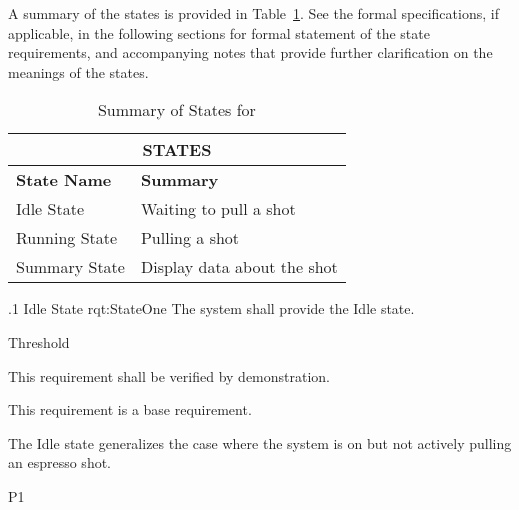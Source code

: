 A summary of the states is provided in Table~\ref{tab:States}.
See the formal specifications, if applicable, in the following sections for formal statement of the state requirements, and accompanying notes that provide further clarification on the meanings of the states.

\begin{table}[h]
	\begin{center}
		\begin{tabular}{|p{1.0in}|p{5.0in}|}
			\hline
			\hline
			\multicolumn{2}{|c|}{{\bf STATES}} \\
			\hline
				{\bf State Name} & {\bf Summary} \\
			\hline
			\hline
Idle State & Waiting to pull a shot \\ \hline
Running State & Pulling a shot \\ \hline
Summary State & Display data about the shot \\ 
			\hline
			\hline
		\end{tabular}
		\caption{Summary of States for \ThisSystem}
		\label{tab:States}
	\end{center}
\end{table}


\ONERQMTV
{\RqtNumberBase.1}
{Idle State}
{rqt:StateOne}
{The system shall provide the Idle state.}
{
	\item [Phase 1] Threshold
}
{This requirement shall be verified by demonstration.}
{
	\item [N/A] This requirement is a base requirement.
}
{
	\item The Idle state generalizes the case where the system is on but not actively pulling an espresso shot. 
}
{P1}



